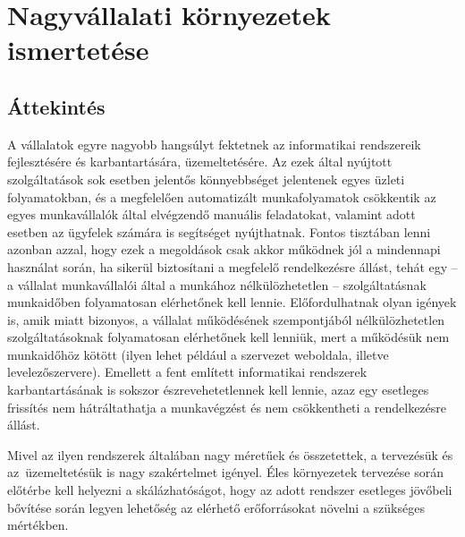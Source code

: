 

\chapter{Nagyvállalati környezetek ismertetése}

\section{Áttekintés}
A vállalatok egyre nagyobb hangsúlyt fektetnek az informatikai rendszereik fejlesztésére és karbantartására, üzemeltetésére. Az ezek által nyújtott szolgáltatások sok esetben jelentős könnyebbséget jelentenek egyes üzleti folyamatokban, és a megfelelően automatizált munkafolyamatok csökkentik az egyes munkavállalók által elvégzendő manuális feladatokat, valamint adott esetben az ügyfelek számára is segítséget nyújthatnak. Fontos tisztában lenni azonban azzal, hogy ezek a megoldások csak akkor működnek jól a mindennapi használat során, ha sikerül biztosítani a megfelelő rendelkezésre állást, tehát egy -- a vállalat munkavállalói által a munkához nélkülözhetetlen -- szolgáltatásnak munkaidőben folyamatosan elérhetőnek kell lennie. Előfordulhatnak olyan igények is, amik miatt bizonyos, a vállalat működésének szempontjából nélkülözhetetlen szolgáltatásoknak folyamatosan elérhetőnek kell lenniük, mert a működésük nem munkaidőhöz kötött (ilyen lehet például a szervezet weboldala, illetve levelezőszervere).  Emellett a fent említett informatikai rendszerek karbantartásának is sokszor észrevehetetlennek kell lennie, azaz egy esetleges frissítés nem hátráltathatja a munkavégzést és nem csökkentheti a rendelkezésre állást.

Mivel az ilyen rendszerek általában nagy méretűek és összetettek, a tervezésük és az~üzemeltetésük is nagy szakértelmet igényel. Éles környezetek tervezése során előtérbe kell helyezni a skálázhatóságot, hogy az adott rendszer esetleges jövőbeli bővítése során legyen lehetőség az elérhető erőforrásokat növelni a szükséges mértékben.



